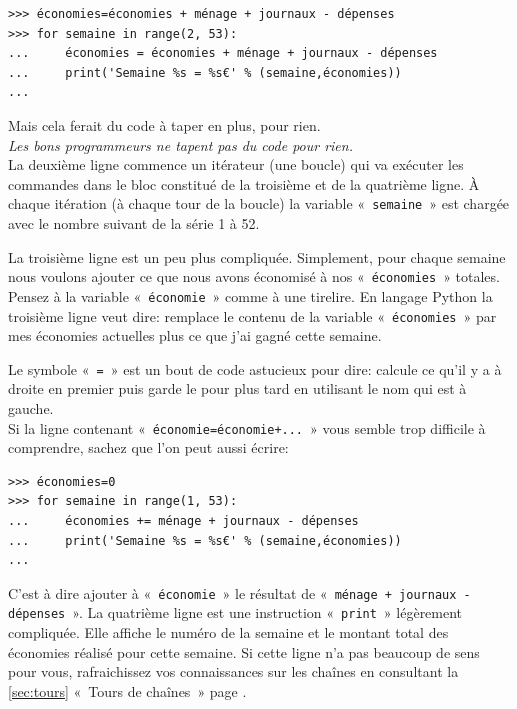 \begin{Verbatim}[frame=single,rulecolor=\color{gray}, label=moche]
>>> économies=économies + ménage + journaux - dépenses
>>> for semaine in range(2, 53):
...     économies = économies + ménage + journaux - dépenses
...     print('Semaine %s = %s€' % (semaine,économies))
... 
\end{Verbatim}

Mais cela ferait du code à taper en plus, pour rien.\\

\emph{Les bons programmeurs ne tapent pas du code pour rien.}\\



La deuxième ligne commence un itérateur (une boucle) qui va exécuter les commandes dans le bloc constitué de la troisième et de la quatrième ligne. À chaque itération (à chaque tour de la boucle) la variable «~\texttt{semaine}~» est chargée avec le nombre suivant de la série 1 à 52.

La troisième ligne est un peu plus compliquée. Simplement, pour chaque semaine nous voulons ajouter ce que nous avons économisé à nos «~\texttt{économies}~» totales. Pensez à la variable «~\texttt{économie}~» comme à une tirelire. En langage Python la troisième ligne veut dire: remplace le contenu de la variable «~\texttt{économies}~» par mes économies actuelles plus ce que j'ai gagné cette semaine.

Le symbole «~\texttt{=}~» est un bout de code astucieux pour dire: calcule ce qu'il y a à droite en premier puis garde le pour plus tard en utilisant le nom qui est à gauche.\\

Si la ligne contenant «~\texttt{économie=économie+...}~» vous semble trop difficile à comprendre, sachez que l'on peut aussi écrire:

\begin{Verbatim}[frame=single,rulecolor=\color{mbleu}, label=à taper]
>>> économies=0
>>> for semaine in range(1, 53):
...     économies += ménage + journaux - dépenses
...     print('Semaine %s = %s€' % (semaine,économies))
... 
\end{Verbatim}

C'est à dire ajouter à «~\texttt{économie}~» le résultat de «~\texttt{ménage + journaux - dépenses}~». La quatrième ligne est une instruction «~\texttt{print}~» légèrement compliquée. Elle affiche le numéro de la semaine et le montant total des économies réalisé pour cette semaine. Si cette ligne n'a pas beaucoup de sens pour vous, rafraichissez vos connaissances sur les chaînes en consultant la \autoref{sec:tours} «~Tours de chaînes~»  page \pageref{sec:tours}.

